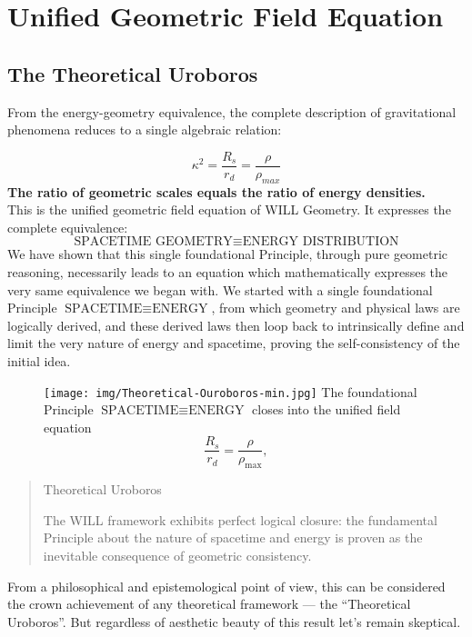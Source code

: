 \documentclass[12pt, a4paper]{article}
\begin{document}
\section{Unified Geometric Field Equation}

\subsection{The Theoretical Uroboros}
From the energy-geometry equivalence, the complete description of gravitational phenomena reduces to a single algebraic relation:

\begin{equation}
\boxed{
\kappa^2 = \frac{R_s}{r_{d}} = \frac{\rho}{\rho_{max}}
}
\label{eq:unified_field}
\end{equation}
                                        \textbf{The ratio of geometric scales equals the ratio of energy densities.}\\

This is the unified geometric field equation of WILL Geometry. It expresses the complete equivalence:
\[
\text{SPACETIME GEOMETRY} \equiv \text{ENERGY DISTRIBUTION}
\]
We have shown that this single foundational Principle, through pure geometric reasoning, necessarily leads to an equation which mathematically expresses the very same equivalence we began with. We started with a single foundational  Principle \(\text{SPACETIME} \equiv \text{ENERGY}\), from which geometry and physical laws are logically derived, and these derived laws then loop back to intrinsically define and limit the very nature of energy and spacetime, proving the self-consistency of the initial idea.

\begin{figure}[h!]
\centering
 \texttt{[image: img/Theoretical-Ouroboros-min.jpg]}
The foundational  Principle \(\text{SPACETIME} \equiv \text{ENERGY}\) closes into the unified field equation
\[
\frac{R_s}{r_d} = \frac{\rho}{\rho_{\max}},
\]
\end{figure}


\begin{quote}
Theoretical Uroboros

The WILL framework exhibits perfect logical closure: the fundamental Principle about the nature of spacetime and energy is proven as the inevitable consequence of geometric consistency.

\end{quote}

  From a philosophical and epistemological point of view, this can be considered the crown achievement of any theoretical framework — the “Theoretical Uroboros”. But regardless of  aesthetic beauty of this result let’s remain skeptical.
\end{document}
